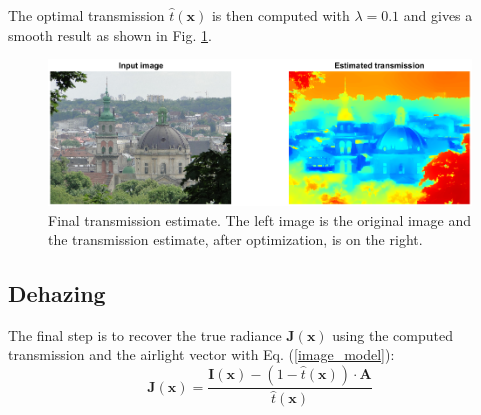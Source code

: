 \documentclass[conference]{IEEEtran}
\begin{document}
The optimal transmission $\hat{t}(\mathbf{x})$ is then computed with $\lambda = 0.1$ and gives a smooth result as shown in Fig. \ref{fig:final_transmission}. 
\begin{figure}
    \centering
    \includegraphics[width=\linewidth]{img/opti.png}
    \caption{Final transmission estimate.  The left image is the original image and the transmission estimate, after optimization, is on the right.}
    \label{fig:final_transmission}
\end{figure}

\subsection{Dehazing}
The final step is to recover the true radiance $\mathbf{J}(\mathbf{x})$ using the computed transmission and the airlight vector with Eq. (\ref{image_model}):
\begin{equation}
    \mathbf{J}(\mathbf{x}) = \frac{\mathbf{I}(\mathbf{x}) - (1 - \hat{t}(\mathbf{x})) \cdot \mathbf{A}}{\hat{t}(\mathbf{x})}
\end{equation}
\end{document}
